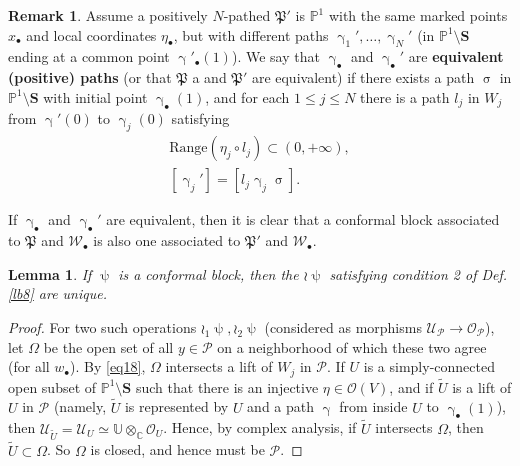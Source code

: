 \documentclass[11pt,b5paper,notitlepage]{article}
\theoremstyle{definition}
\newtheorem{rem}[df]{Remark}
\theoremstyle{plain}
\newtheorem{lm}[df]{Lemma}
\newcommand{\fk}{\mathfrak}
\newcommand{\mc}{\mathcal}
\newcommand{\wtd}{\widetilde}
\newcommand{\scr}{\mathscr}
\newcommand{\blt}{\bullet}
\newcommand{\Ubb}{\mathbb U}
\newcommand{\Cbb}{\mathbb C}
\newcommand{\Pbb}{\mathbb P}
\newcommand{\Sbf}{\mathbf{S}}
\numberwithin{equation}{subsection}
\begin{document}
\begin{rem}\label{lb2}
Assume a positively $N$-pathed $\fk P'$ is $\Pbb^1$ with the same marked points $x_\blt$ and local coordinates $\eta_\blt$, but with different paths $\upgamma_1',\dots,\upgamma_N'$ (in $\Pbb^1\setminus\Sbf$ ending at a common point $\upgamma'_\blt(1)$). We say that $\upgamma_\blt$ and $\upgamma_\blt'$ are \textbf{equivalent (positive) paths} (or that $\fk P$ a and $\fk P'$ are equivalent)  if there exists a path $\upsigma$ in $\Pbb^1\setminus\Sbf$ with initial point $\upgamma_\blt(1)$, and for each $1\leq j\leq N$ there is a path $l_j$ in $W_j$ from $\upgamma'(0)$ to $\upgamma_j(0)$ satisfying 
\begin{gather}
	\mathrm{Range}(\eta_j\circ l_j)\subset(0,+\infty),\label{eq53}\\
	[\upgamma_j']=[l_j\upgamma_j\upsigma].	\label{eq66}
\end{gather}


If $\upgamma_\blt$ and $\upgamma_\blt'$ are equivalent, then it is clear that a conformal block associated to $\fk P$ and $\mc W_\blt$ is also one associated to $\fk P'$ and $\mc W_\blt$.
\end{rem}





\begin{lm}
If $\uppsi$ is a conformal block, then the $\wr\uppsi$ satisfying condition 2 of Def. \ref{lb8} are unique. 
\end{lm}

\begin{proof}
For two such operations $\wr_1\uppsi,\wr_2\uppsi$ (considered as morphisms $\scr U_{\mc P}\rightarrow\scr O_{\mc P}$), let $\Omega$ be the open set of all $y\in\mc P$ on a neighborhood of which these two agree (for all $w_\blt$). By \eqref{eq18}, $\Omega$ intersects a lift of $W_j$ in $\mc P$. If $U$ is a simply-connected open subset of $\Pbb^1\setminus\Sbf$ such that there is an injective $\eta\in\scr O(V)$, and if $\wtd U$ is a lift of $U$ in $\mc P$ (namely, $\wtd U$ is represented by $U$ and a path $\upgamma$ from inside $U$ to $\upgamma_\blt(1)$), then $\scr U_{\wtd U}=\scr U_U\simeq\Ubb\otimes_\Cbb\scr O_U$. Hence, by complex analysis, if $\wtd U$ intersects $\Omega$,  then $\wtd U\subset\Omega$. So $\Omega$ is closed, and hence must be $\mc P$.
\end{proof}
\end{document}
